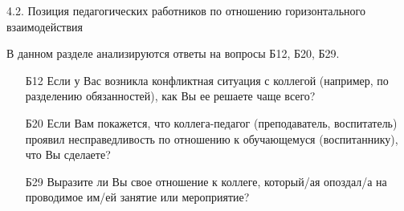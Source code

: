 \begin{frame}{4.2. Позиция педагогических работников по отношению горизонтального взаимодействия}

\tiny

В данном разделе анализируются ответы на вопросы Б12, Б20, Б29.
\bigskip

\begin{itemize}

\item [Б12] Если у Вас возникла конфликтная ситуация с коллегой (например, по разделению обязанностей), как Вы ее решаете чаще всего?

\item [Б20] Если Вам покажется, что коллега-педагог (преподаватель, воспитатель) проявил несправедливость по отношению к обучающемуся (воспитаннику), что Вы сделаете?

\item [Б29] Выразите ли Вы свое отношение к коллеге, который/ая опоздал/а на проводимое им/ей занятие или мероприятие?

\end{itemize}

\end{frame}


